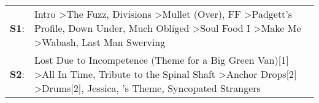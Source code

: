 \begin{supertabular}{p{0.03\textwidth}p{0.92\textwidth}}
 \textbf{S1}:  &  Intro\textsuperscript{} \textgreater \enspace The Fuzz\textsuperscript{}, \enspace Divisions\textsuperscript{} \textgreater \enspace Mullet (Over)\textsuperscript{}, \enspace FF\textsuperscript{} \textgreater \enspace Padgett's Profile\textsuperscript{}, \enspace Down Under\textsuperscript{}, \enspace Much Obliged\textsuperscript{} \textgreater \enspace Soul Food I\textsuperscript{} \textgreater \enspace Make Me\textsuperscript{} \textgreater \enspace Wabash\textsuperscript{}, \enspace Last Man Swerving\textsuperscript{}  \enspace  \\
 \textbf{S2}:  &                                                                                                                      Lost Due to Incompetence (Theme for a Big Green Van)[1]\textsuperscript{} \textgreater \enspace All In Time\textsuperscript{}, \enspace Tribute to the Spinal Shaft\textsuperscript{} \textgreater \enspace Anchor Drops[2]\textsuperscript{} \textgreater \enspace Drums[2]\textsuperscript{}, \enspace Jessica\textsuperscript{}, 's Theme\textsuperscript{}, \enspace Syncopated Strangers\textsuperscript{}  \enspace  \\
\end{supertabular}
